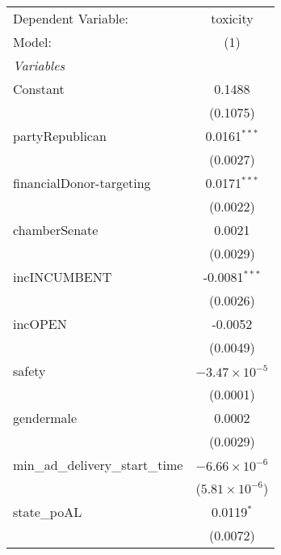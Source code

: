 
\begingroup
\centering
\begin{tabular}{lc}
   \tabularnewline \midrule \midrule
   Dependent Variable:                                & toxicity\\  
   Model:                                             & (1)\\  
   \midrule
   \emph{Variables}\\
   Constant                                           & 0.1488\\   
                                                      & (0.1075)\\   
   partyRepublican                                    & 0.0161$^{***}$\\   
                                                      & (0.0027)\\   
   financialDonor-targeting                           & 0.0171$^{***}$\\   
                                                      & (0.0022)\\   
   chamberSenate                                      & 0.0021\\   
                                                      & (0.0029)\\   
   incINCUMBENT                                       & -0.0081$^{***}$\\   
                                                      & (0.0026)\\   
   incOPEN                                            & -0.0052\\   
                                                      & (0.0049)\\   
   safety                                             & $-3.47\times 10^{-5}$\\    
                                                      & (0.0001)\\   
   gendermale                                         & 0.0002\\   
                                                      & (0.0029)\\   
   min\_ad\_delivery\_start\_time                     & $-6.66\times 10^{-6}$\\    
                                                      & ($5.81\times 10^{-6}$)\\    
   state\_poAL                                        & 0.0119$^{*}$\\   
                                                      & (0.0072)\\   

\end{tabular}
